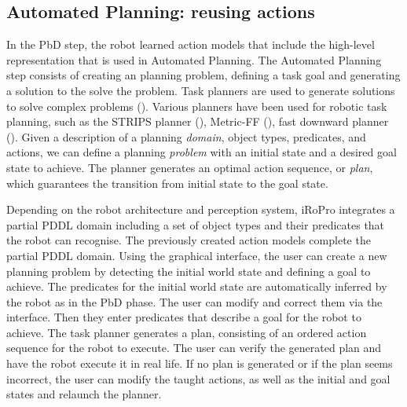 


\subsection{Automated Planning: reusing actions}\label{sec:AP}
In the PbD step, the robot learned action models that include the high-level representation that is used in Automated Planning. 
The Automated Planning step consists of creating an planning problem, defining a task goal and generating a solution to the solve the problem.
Task planners are used to generate solutions to solve complex problems ().
Various planners have been used for robotic task planning, such as the STRIPS planner (\cite{she2014teaching}), Metric-FF (\cite{cubek2015high}), fast downward planner (\cite{abdo2013learning}). 
Given a description of a planning \textit{domain}, \ie object types, predicates, and actions, we can define a planning \textit{problem} with an initial state and a desired goal state to achieve. 
The planner generates an optimal action sequence, or \textit{plan}, which guarantees the transition from initial state to the goal state. 

Depending on the robot architecture and perception system, iRoPro integrates a partial PDDL domain including a set of object types and their predicates that the robot can recognise.
The previously created action models complete the partial PDDL domain.
Using the graphical interface, the user can create a new planning problem by detecting the initial world state and defining a goal to achieve.
The predicates for the initial world state are automatically inferred by the robot as in the PbD phase.
The user can modify and correct them via the interface. 
Then they enter predicates that describe a goal for the robot to achieve.
The task planner generates a plan, consisting of an ordered action sequence for the robot to execute. 
The user can verify the generated plan and have the robot execute it in real life.
If no plan is generated or if the plan seems incorrect, the user can modify the taught actions, as well as the initial and goal states and relaunch the planner.

